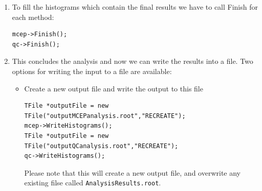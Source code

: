 \documentclass[a5paper]{book}
\numberwithin{equation}{subsection}
\begin{document}
\begin{enumerate}
	We do this in an event loop. First define the number of events that need to be created, their multiplicity, and a value $v_2$ value, which can either be supplied as a fixed number (no $p_t$ dependence) of a function (to generate $p_t$ differential flow\footnote{The on the fly event generator is not limited to the generation of the second harmonic $v_2$, but to get started, this is a nice example}
	
	\begin{lstlisting}
	Int_t nEvents = 1000;	// generate 1000 events
	Int_t mult = 2000;		// use track multiplicity of 2000
	Double_t v2 = .05;		// 5 pct integrated flow
	// or sample differential flow
	TF1* diffv2 = new TF1("diffv2", "((x<1.)*(0.1/1.)*x+(x>=1.)*0.1)", 0., 20.); \end{lstlisting}
	
Now we have all the ingredients to our first flow analysis	
	
	\begin{lstlisting}
for(Int_t i=0; i<nEvts; i++) { 
      // make an event with mult particles 
      AliFlowEventSimple* event = new AliFlowEventSimple(mult,AliFlowEventSimple::kGenerate);
      // modify the tracks adding the flow value v2
      event->AddV2(diffv2);
      // select the particles for the reference flow
      event->TagRP(cutsRP);
      // select the particles for differential flow
      event->TagPOI(cutsPOI);
      // do flow analysis with various methods:
      mcep->Make(event);
      qc->Make(event);
} \end{lstlisting}
	\item To fill the histograms which contain the final results we have to call Finish for each method:
	\begin{lstlisting}
mcep->Finish(); 
qc->Finish(); \end{lstlisting}
	\item This concludes the analysis and now we can write the results into a file. Two options for writing the input to a file are available: 
     \begin{itemize}
     \item Create a new output file and write the output to this file
     \begin{lstlisting}
TFile *outputFile = new TFile("outputMCEPanalysis.root","RECREATE");
mcep->WriteHistograms();
TFile *outputFile = new TFile("outputQCanalysis.root","RECREATE");
qc->WriteHistograms();
\end{lstlisting}

Please note that this will create a new output file, and overwrite any existing filse called \texttt{AnalysisResults.root}.


\end{itemize}
\end{enumerate}
\end{document}

